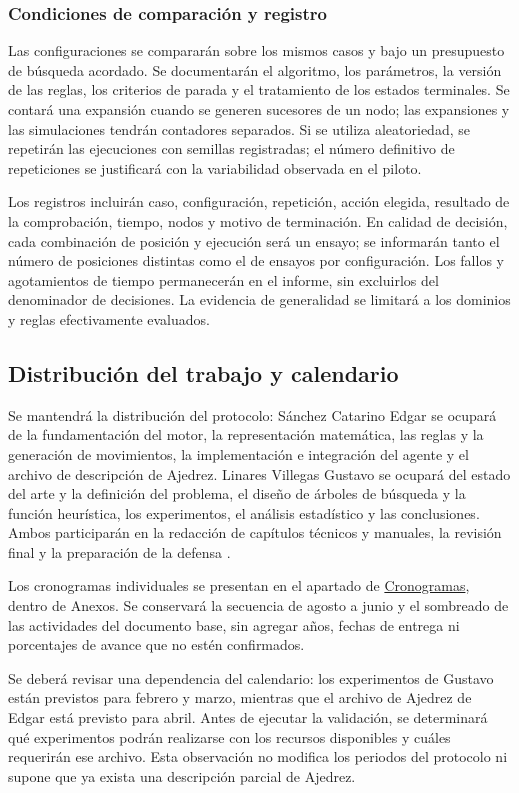\subsubsection{Condiciones de comparación y registro}

Las configuraciones se compararán sobre los mismos casos y bajo un presupuesto de búsqueda acordado. Se documentarán el algoritmo, los parámetros, la versión de las reglas, los criterios de parada y el tratamiento de los estados terminales. Se contará una expansión cuando se generen sucesores de un nodo; las expansiones y las simulaciones tendrán contadores separados. Si se utiliza aleatoriedad, se repetirán las ejecuciones con semillas registradas; el número definitivo de repeticiones se justificará con la variabilidad observada en el piloto.

Los registros incluirán caso, configuración, repetición, acción elegida, resultado de la comprobación, tiempo, nodos y motivo de terminación. En calidad de decisión, cada combinación de posición y ejecución será un ensayo; se informarán tanto el número de posiciones distintas como el de ensayos por configuración. Los fallos y agotamientos de tiempo permanecerán en el informe, sin excluirlos del denominador de decisiones. La evidencia de generalidad se limitará a los dominios y reglas efectivamente evaluados.

\subsection{Distribución del trabajo y calendario}

Se mantendrá la distribución del protocolo: Sánchez Catarino Edgar se ocupará de la fundamentación del motor, la representación matemática, las reglas y la generación de movimientos, la implementación e integración del agente y el archivo de descripción de Ajedrez. Linares Villegas Gustavo se ocupará del estado del arte y la definición del problema, el diseño de árboles de búsqueda y la función heurística, los experimentos, el análisis estadístico y las conclusiones. Ambos participarán en la redacción de capítulos técnicos y manuales, la revisión final y la preparación de la defensa \cite{ProtocoloTT2027A178}.

Los cronogramas individuales se presentan en el apartado de \hyperref[sec:cronogramas]{Cronogramas}, dentro de Anexos. Se conservará la secuencia de agosto a junio y el sombreado de las actividades del documento base, sin agregar años, fechas de entrega ni porcentajes de avance que no estén confirmados.

Se deberá revisar una dependencia del calendario: los experimentos de Gustavo están previstos para febrero y marzo, mientras que el archivo de Ajedrez de Edgar está previsto para abril. Antes de ejecutar la validación, se determinará qué experimentos podrán realizarse con los recursos disponibles y cuáles requerirán ese archivo. Esta observación no modifica los periodos del protocolo ni supone que ya exista una descripción parcial de Ajedrez.
